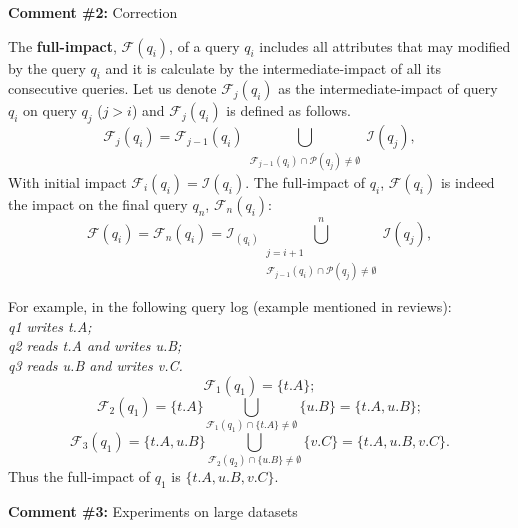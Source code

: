 

\comskip

\noindent
\textbf{Comment \#2:} Correction
\begin{quote}
\end{quote}



The \textbf{full-impact}, $\mathcal{F}(q_i)$, of a query $q_i$ includes all
attributes that may modified by the query $q_i$ and it is calculate by the
intermediate-impact of all its consecutive queries. Let us denote
$\mathcal{F}_j(q_i)$ as the intermediate-impact of query $q_i$ on query $q_j$
($j > i$) and $\mathcal{F}_j(q_i)$ is defined as follows. \[
\mathcal{F}_j(q_i)=\mathcal{F}_{j-1}(q_i)\bigcup_{\substack{\mathcal{F}_{j-1}(q_i)\cap
\mathcal{P}(q_j) \neq \emptyset}} \mathcal{I}(q_j), \] With initial impact
$\mathcal{F}_i(q_i) = \mathcal{I}(q_i)$. The full-impact of $q_i$,
$\mathcal{F}(q_i)$ is indeed the impact on the final query $q_n$,
$\mathcal{F}_n(q_i)$: \[ \mathcal{F}(q_i)=\mathcal{F}_n(q_i) =
\mathcal{I}_(q_i)\bigcup_{\substack{j = i+1 \\ \mathcal{F}_{j-1}(q_i)\cap
\mathcal{P}(q_j) \neq \emptyset}}^n \mathcal{I}(q_j), \]

For example, in the following query log (example mentioned in reviews):\\
\textit{\indent q1 writes t.A; \\
\indent q2 reads t.A and writes u.B; \\
\indent q3 reads u.B and writes v.C.}\\
\[\mathcal{F}_1(q_1) = \{t.A\};\] 
\[\mathcal{F}_2(q_1) = \{t.A\} \bigcup_{\mathcal{F}_1(q_1) \cap \{t.A\} \neq \emptyset} \{u.B\} = \{t.A, u.B\};\]
\[\mathcal{F}_3(q_1) = \{t.A, u.B\}\bigcup_{\mathcal{F}_2(q_2) \cap \{u.B\} \neq \emptyset} \{v.C\} = \{t.A, u.B, v.C\}.\]
Thus the full-impact of $q_1$ is $\{t.A, u.B, v.C\}$.




\comskip

\noindent
\textbf{Comment \#3:} Experiments on large datasets
\begin{quote}
\end{quote}


